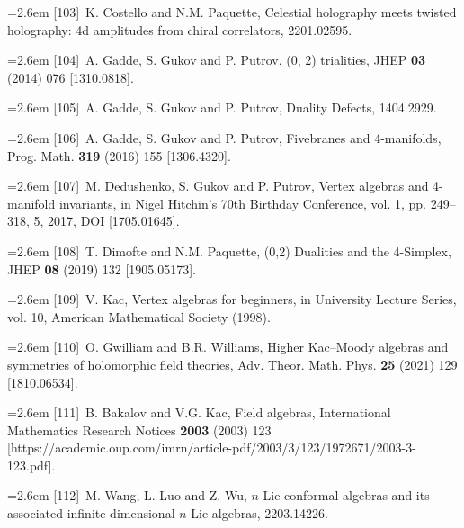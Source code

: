 \par\noindent\hangindent=2.6em [103]~K. Costello and N.M. Paquette, Celestial holography meets twisted holography: 4d amplitudes from chiral correlators, 2201.02595.

\par\noindent\hangindent=2.6em [104]~A. Gadde, S. Gukov and P. Putrov, (0, 2) trialities, JHEP \textbf{03} (2014) 076 [1310.0818].


\par\noindent\hangindent=2.6em [105]~A. Gadde, S. Gukov and P. Putrov, Duality Defects, 1404.2929.

\par\noindent\hangindent=2.6em [106]~A. Gadde, S. Gukov and P. Putrov, Fivebranes and 4-manifolds, Prog. Math. \textbf{319} (2016) 155 [1306.4320].

\par\noindent\hangindent=2.6em [107]~M. Dedushenko, S. Gukov and P. Putrov, Vertex algebras and 4-manifold invariants, in Nigel Hitchin's 70th Birthday Conference, vol. 1, pp. 249--318, 5, 2017, DOI [1705.01645].

\par\noindent\hangindent=2.6em [108]~T. Dimofte and N.M. Paquette, (0,2) Dualities and the 4-Simplex, JHEP \textbf{08} (2019) 132 [1905.05173].

\par\noindent\hangindent=2.6em [109]~V. Kac, Vertex algebras for beginners, in University Lecture Series, vol. 10, American Mathematical Society (1998).

\par\noindent\hangindent=2.6em [110]~O. Gwilliam and B.R. Williams, Higher Kac--Moody algebras and symmetries of holomorphic field theories, Adv. Theor. Math. Phys. \textbf{25} (2021) 129 [1810.06534].

\par\noindent\hangindent=2.6em [111]~B. Bakalov and V.G. Kac, Field algebras, International Mathematics Research Notices \textbf{2003} (2003) 123 [https://academic.oup.com/imrn/article-pdf/2003/3/123/1972671/2003-3-123.pdf].

\par\noindent\hangindent=2.6em [112]~M. Wang, L. Luo and Z. Wu, $n$-Lie conformal algebras and its associated infinite-dimensional $n$-Lie algebras, 2203.14226.

